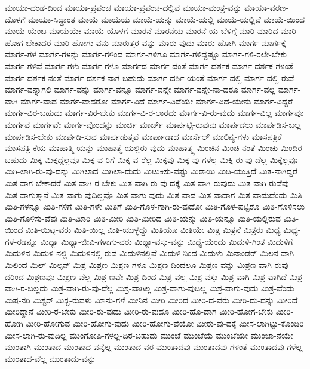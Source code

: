 {ಮಾಯಾ-ದಂಡ-ದಿಂದ
ಮಾಯಾ-ಪ್ರಪಂಚ
ಮಾಯಾ-ಪ್ರಪಂಚ-ದಲ್ಲಿವೆ
ಮಾಯಾ-ಮಂತ್ರ-ವನ್ನು
ಮಾಯಾ-ವರಣ-ದೊಳಗೆ
ಮಾಯಾ-ಸಿದ್ಧಾಂತ
ಮಾಯೆ
ಮಾಯೆಯ
ಮಾಯೆ-ಯನ್ನು
ಮಾಯೆ-ಯಲ್ಲಿ
ಮಾಯೆ-ಯಲ್ಲಿವೆ
ಮಾಯೆ-ಯಿಂದ
ಮಾಯೆ-ಯೆಂಬ
ಮಾಯೆಯೇ
ಮಾಯೆ-ಯೊಳಗೆ
ಮಾರನೆ
ಮಾರನೆಯ
ಮಾರನೆ-ಯ-ಬೆಳಿಗ್ಗೆ
ಮಾರಿ
ಮಾರಿದ
ಮಾರಿ-ಹೋಗ-ಬೇಕಾದರೆ
ಮಾರಿ-ಹೋಗು-ವನು
ಮಾರುತ್ತರ-ವನ್ನು
ಮಾರು-ವುದು
ಮಾರು-ಹೋಗಿ
ಮಾರ್ಗ
ಮಾರ್ಗಕ್ಕೆ
ಮಾರ್ಗ-ಗಳ
ಮಾರ್ಗ-ಗಳನ್ನು
ಮಾರ್ಗ-ಗಳಿಂದ
ಮಾರ್ಗ-ಗಳಿಗೂ
ಮಾರ್ಗ-ಗಳಿದ್ದಷ್ಟೂ
ಮಾರ್ಗ-ಗಳಿ-ರಲೇ-ಬೇಕು
ಮಾರ್ಗ-ಗಳಿವೆ
ಮಾರ್ಗ-ಗಳು
ಮಾರ್ಗ-ಗಳೂ
ಮಾರ್ಗದ
ಮಾರ್ಗ-ದಂತೆ
ಮಾರ್ಗ-ದರ್ಶಕ
ಮಾರ್ಗ-ದರ್ಶಕ-ಗಳಂತೆ
ಮಾರ್ಗ-ದರ್ಶಕ-ನಂತೆ
ಮಾರ್ಗ-ದರ್ಶಕ-ನಾಗ-ಬಹುದು
ಮಾರ್ಗ-ದರ್ಶಿ-ಯಂತೆ
ಮಾರ್ಗ-ದಲ್ಲಿ
ಮಾರ್ಗ-ದಲ್ಲಿ-ರುವೆ
ಮಾರ್ಗ-ವನ್ನಾಗಲಿ
ಮಾರ್ಗ-ವನ್ನು
ಮಾರ್ಗ-ವನ್ನೂ
ಮಾರ್ಗ-ವನ್ನೇ
ಮಾರ್ಗ-ವನ್ನೇ-ನಾ-ದರೂ
ಮಾರ್ಗ-ವಲ್ಲ
ಮಾರ್ಗ-ವಾಗಿ
ಮಾರ್ಗ-ವಾದ
ಮಾರ್ಗ-ವಾದರೋ
ಮಾರ್ಗ-ವಿದೆ
ಮಾರ್ಗ-ವಿದೆಯೇ
ಮಾರ್ಗ-ವಿದೆ-ಯೇನು
ಮಾರ್ಗ-ವಿದ್ದರೆ
ಮಾರ್ಗ-ವಿರ-ಬಹುದು
ಮಾರ್ಗ-ವಿರ-ಬೇಕು
ಮಾರ್ಗ-ವಿ-ರ-ಲಾರದು
ಮಾರ್ಗ-ವಿ-ರು-ವುದು
ಮಾರ್ಗ-ವಿಲ್ಲ
ಮಾರ್ಗವೂ
ಮಾರ್ಗವೆ
ಮಾರ್ಗವೇ
ಮಾರ್ಗ-ವೊಂದನ್ನು
ಮಾರ್ಚಿ
ಮಾರ್ಚ್
ಮಾರ್ಪಟ್ಟಿ-ರುವುವು
ಮಾರ್ಪಡಲು
ಮಾರ್ಪಡಿಸ-ಬಲ್ಲ
ಮಾರ್ಪಡಿಸ-ಬೇಕು
ಮಾರ್ಪಡಿ-ಸುವ
ಮಾರ್ಪಡುತ್ತವೆ
ಮಾರ್ಪಾಡಾದ
ಮಾರ್ಸೆಲ್
ಮಾಲಿನ್ಯ-ಗಳು
ಮಾಸಪತ್ರಿಕೆ
ಮಾಸಪತ್ರಿ-ಕೆಯ
ಮಾಹಾತ್ಮಿ-ಯನ್ನು
ಮಾಹಾತ್ಮೆ-ಯಲ್ಲಿರು-ವುದು
ಮಾಹಾತ್ಮ್ಯ
ಮಿಂಚಿನ
ಮಿಂಚಿ-ನಂತೆ
ಮಿಂಚು
ಮಿಂದಿರ-ಬಹುದು
ಮಿಕ್ಕ
ಮಿಕ್ಕದ್ದೆಲ್ಲವೂ
ಮಿಕ್ಕ-ವ-ರಿಗೆ
ಮಿಕ್ಕ-ವ-ರೆಲ್ಲ
ಮಿಕ್ಕವು
ಮಿಕ್ಕ-ವು-ಗಳೆಲ್ಲ
ಮಿಕ್ಕಿ-ರು-ವು-ದೆಲ್ಲ
ಮಿಕ್ಕೆಲ್ಲವೂ
ಮಿಗಿ-ಲಾಗಿ-ರು-ವು-ದನ್ನು
ಮಿಗಿಲಾದ
ಮಿಗಿಲಾ-ದುದು
ಮಿಟುಕಿಸು-ವಷ್ಟು
ಮಿಠಾಯಿ
ಮಿಡಿ-ಯುತ್ತಿದೆ
ಮಿತ-ನಾಗಿದ್ದರೆ
ಮಿತ-ವಾಗ-ಬೇಕಾದರೆ
ಮಿತ-ವಾಗಿ-ರ-ಬೇಕು
ಮಿತ-ವಾಗಿ-ರು-ವು-ದಕ್ಕೆ
ಮಿತ-ವಾಗಿ-ರುವುದು
ಮಿತ-ವಾಗಿ-ರುವೆವು
ಮಿತ-ವಾಗುತ್ತಾನೆ
ಮಿತ-ವಾಗು-ವುದಿಲ್ಲವೊ
ಮಿತ-ವಾಗು-ವುದು
ಮಿತ-ವಾದ
ಮಿತ-ವಾದಾಗ
ಮಿತ-ವಾದುದೆಂದು
ಮಿತಿ
ಮಿತಿ-ಗಳನ್ನೂ
ಮಿತಿ-ಗಳಿಗೆ
ಮಿತಿ-ಗಳೇ
ಮಿತಿಗೆ
ಮಿತಿ-ಗೊಳ-ಗಾಗಿ-ರು-ವುದೋ
ಮಿತಿ-ಗೊಳ-ಪಟ್ಟಿರೊ
ಮಿತಿ-ಗೊಳಿಸಲು
ಮಿತಿ-ಗೊಳಿಸು-ವೆವು
ಮಿತಿ-ಮಿಾರಿ
ಮಿತಿ-ಮೀರಿ
ಮಿತಿ-ಮೀರಿದ
ಮಿತಿ-ಯನ್ನು
ಮಿತಿ-ಯನ್ನೂ
ಮಿತಿ-ಯಲ್ಲಿರುವ
ಮಿತಿ-ಯಿಂದ
ಮಿತಿ-ಯಿಟ್ಟ-ವರು
ಮಿತಿ-ಯಿಲ್ಲ
ಮಿತಿ-ಯುಳ್ಳದ್ದು
ಮಿತಿಯೂ
ಮಿತಿಯೇ
ಮಿತ್ರ
ಮಿತ್ರನೆ
ಮಿತ್ರರು
ಮಿಥ್ಯ
ಮಿಥ್ಯ-ಗಳೆ-ರಡನ್ನೂ
ಮಿಥ್ಯಾ
ಮಿಥ್ಯಾ-ಜೀವಿ-ಗಳಾಗು-ವರು
ಮಿಥ್ಯಾ-ವಸ್ತು-ವನ್ನು
ಮಿಥ್ಯೆ-ಯೆಂದು
ಮಿದುಳಿ-ಗಿಂತ
ಮಿದುಳಿಗೆ
ಮಿದುಳಿನ
ಮಿದುಳಿ-ನಲ್ಲಿ
ಮಿದುಳಿನಲ್ಲಿ-ರುವ
ಮಿದುಳಿನಲ್ಲಿವೆ
ಮಿದುಳಿ-ನಿಂದ
ಮಿದುಳು
ಮಿನಾಂಡರ್
ಮಿಲನ-ವಾಗಿ
ಮಿಲಿಂದ
ಮಿಲ್
ಮಿಲ್ಟನ್
ಮಿಶ್ರ
ಮಿಶ್ರಣ
ಮಿಶ್ರಣ-ಗಳೂ
ಮಿಶ್ರಣ-ದಿಂದಲೂ
ಮಿಶ್ರಣ-ವನ್ನು
ಮಿಶ್ರಣ-ವಾಗಿ-ರುವು-ದರಿಂದ
ಮಿಶ್ರಣವೂ
ಮಿಶ್ರಣ-ವೆಲ್ಲ
ಮಿಶ್ರ-ಣವೇ
ಮಿಶ್ರ-ದಿಂದ
ಮಿಶ್ರ-ವಲ್ಲ
ಮಿಶ್ರ-ವಸ್ತು
ಮಿಶ್ರ-ವಾಗಿ
ಮಿಶ್ರ-ವಾಗಿದೆ
ಮಿಶ್ರ-ವಾಗಿ-ರ-ಬಲ್ಲದು
ಮಿಶ್ರ-ವಾಗಿ-ರು-ವು-ದೆಲ್ಲ
ಮಿಶ್ರ-ವಾಗಿಲ್ಲ
ಮಿಶ್ರ-ವಾಗು-ವುದಿಲ್ಲ
ಮಿಶ್ರ-ವಾಗು-ವುದು
ಮಿಶ್ರ-ವೆಂದು
ಮಿಷ-ನರಿ
ಮಿಸ್ಟರ್
ಮಿಸ್ಬ-ರುವಳು
ಮಿಾನು-ಗಳೆ
ಮೀನಿನ
ಮೀರಿ
ಮೀರಿದ
ಮೀರಿ-ದ-ವರು
ಮೀರಿ-ದು-ದನ್ನು
ಮೀರಿದೆ
ಮೀರಿದ್ದಾನೆ
ಮೀರಿ-ರ-ಬೇಕು
ಮೀರಿ-ರು-ವುದು
ಮೀರಿ-ರು-ವುದೂ
ಮೀರಿ-ಹೊ-ದಾಗ
ಮೀರಿ-ಹೋಗ-ಬೇಕು
ಮೀರಿ-ಹೋಗಿ
ಮೀರಿ-ಹೋಗುವ
ಮೀರಿ-ಹೋಗು-ವುದು
ಮೀರಿ-ಹೋಗು-ವೆಯೋ
ಮೀರು-ವು-ದಕ್ಕೆ
ಮೀಸ-ಲಾಗಿಟ್ಟು-ಕೊಂಡಿರಿ
ಮೀಸ-ಲಾಗಿ-ರು-ವುದಿಲ್ಲ
ಮುಂಗೋಪಿ-ಗಳಲ್ಲ-ದಿರ-ಬಹುದು
ಮುಂಚೆ
ಮುಂಚೆಯೆ
ಮುಂಚೆಯೇ
ಮುಂಜಾ-ನೆಯೇ
ಮುಂತಾಗಿ
ಮುಂತಾದ
ಮುಂತಾದ-ವನ್ನೆಲ್ಲ
ಮುಂತಾದ-ವರ
ಮುಂತಾದವು
ಮುಂತಾದವು-ಗಳಂತೆ
ಮುಂತಾದವು-ಗಳೆಲ್ಲ
ಮುಂತಾದ-ವೆಲ್ಲ
ಮುಂತಾದು-ವನ್ನು
}
